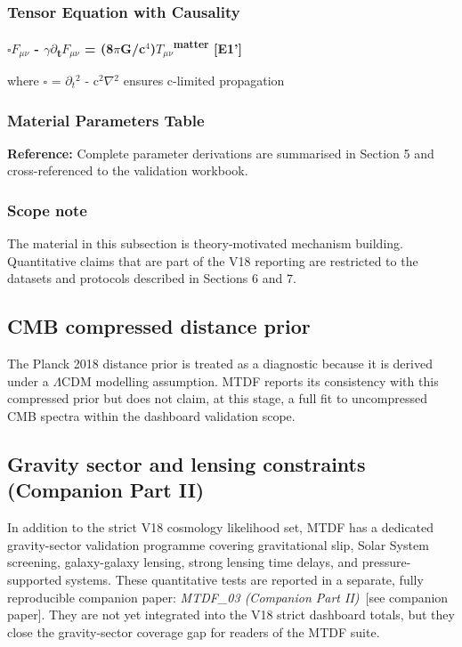 \documentclass[11pt,a4paper]{article}
\begin{document}
\subsubsection{Tensor Equation with Causality}
\textbf{$\square$$F_{\mu\nu}$ - $\gamma$$\partial$\textsubscript{t}$F_{\mu\nu}$ = (8$\pi$G/\allowbreak{}c$^{4}$)$T_{\mu\nu}$\textsuperscript{matter} [E1']}

where $\square$ = $\partial$$_{t}$$^{2}$ - c$^{2}$$\nabla$$^{2}$ ensures c-limited propagation

\begin{mdframed}[linecolor=accent,linewidth=0.5pt,backgroundcolor=callout-bg,leftline=true,rightline=true,topline=true,bottomline=true,innerleftmargin=8pt,innerrightmargin=8pt,innertopmargin=6pt,innerbottommargin=6pt]
\subsubsection{Material Parameters Table}
\textbf{Reference:} Complete parameter derivations are summarised in Section 5 and cross-referenced to the validation workbook.
\end{mdframed}

\begin{mdframed}[linecolor=accent,linewidth=0.5pt,backgroundcolor=callout-bg,leftline=true,rightline=true,topline=true,bottomline=true,innerleftmargin=8pt,innerrightmargin=8pt,innertopmargin=6pt,innerbottommargin=6pt]
\subsubsection{Scope note}
The material in this subsection is theory-motivated mechanism building. Quantitative claims that are part of the V18 reporting are restricted to the datasets and protocols described in Sections 6 and 7.
\end{mdframed}

\subsection{CMB compressed distance prior}
The Planck 2018 distance prior is treated as a diagnostic because it is derived under a $\Lambda$CDM modelling assumption. MTDF reports its consistency with this compressed prior but does not claim, at this stage, a full fit to uncompressed CMB spectra within the dashboard validation scope.

\subsection{Gravity sector and lensing constraints (Companion Part II)}
In addition to the strict V18 cosmology likelihood set, MTDF has a dedicated gravity-sector validation programme covering
gravitational slip, Solar System screening, galaxy-galaxy lensing, strong lensing time delays, and pressure-supported systems.
These quantitative tests are reported in a separate, fully reproducible companion paper:
\textit{MTDF\_\allowbreak{}03 (Companion Part II)}~[see companion paper].
They are not yet integrated into the V18 strict dashboard totals, but they close the gravity-sector coverage gap for readers of the MTDF suite.
\end{document}
